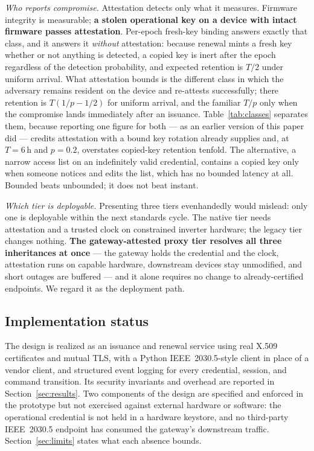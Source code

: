 \emph{Who reports compromise.} Attestation detects only what it measures. Firmware integrity is
measurable; \textbf{a stolen operational key on a device with intact firmware passes
attestation}. Per-epoch fresh-key binding answers exactly that class, and it answers it
\emph{without} attestation: because renewal mints a fresh key whether or not anything is
detected, a copied key is inert after the epoch regardless of the detection probability, and
expected retention is $T/2$ under uniform arrival. What attestation bounds is the different class
in which the adversary remains resident on the device and re-attests successfully; there
retention is $T(1/p - 1/2)$ for uniform arrival, and the familiar $T/p$ only when the compromise
lands immediately after an issuance. Table~\ref{tab:classes} separates them, because reporting one
figure for both --- as an earlier version of this paper did --- credits attestation with a bound
key rotation already supplies and, at $T{=}6$\,h and $p{=}0.2$, overstates copied-key retention
tenfold. The alternative, a narrow access list on an indefinitely valid credential, contains a
copied key only when someone notices and edits the list, which has no bounded latency at all.
Bounded beats unbounded; it does not beat instant.

\emph{Which tier is deployable.} Presenting three tiers evenhandedly would mislead: only one is
deployable within the next standards cycle. The native tier needs attestation and a trusted clock
on constrained inverter hardware; the legacy tier changes nothing. \textbf{The gateway-attested
proxy tier resolves all three inheritances at once} --- the gateway holds the credential and the
clock, attestation runs on capable hardware, downstream devices stay unmodified, and short
outages are buffered --- and it alone requires no change to already-certified endpoints. We regard
it as the deployment path.

\subsection{Implementation status}
The design is realized as an issuance and renewal service using real X.509 certificates and mutual
TLS, with a Python IEEE~2030.5-style client in place of a vendor client, and structured event
logging for every credential, session, and command transition. Its security invariants and
overhead are reported in Section~\ref{sec:results}. Two components of the design are specified and
enforced in the prototype but not exercised against external hardware or software: the operational
credential is not held in a hardware keystore, and no third-party IEEE~2030.5 endpoint has
consumed the gateway's downstream traffic. Section~\ref{sec:limits} states what each absence
bounds.
